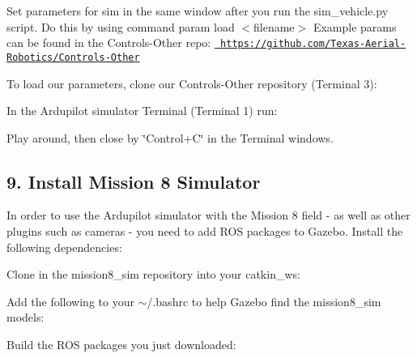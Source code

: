 Set parameters for sim in the same window after you run the {\ttfamily sim\+\_\+vehicle.\+py script}. Do this by using command {\ttfamily param load $<$filename$>$} Example params can be found in the {\ttfamily Controls-\/\+Other} repo\+: \href{https://github.com/Texas-Aerial-Robotics/Controls-Other}{\texttt{ https\+://github.\+com/\+Texas-\/\+Aerial-\/\+Robotics/\+Controls-\/\+Other}}

To load our parameters, clone our {\ttfamily Controls-\/\+Other} repository (Terminal 3)\+: 
\begin{DoxyCode}{0}
\end{DoxyCode}
 In the Ardupilot simulator Terminal (Terminal 1) run\+: 
\begin{DoxyCode}{0}
\end{DoxyCode}
 Play around, then close by \char`\"{}\+Control+\+C\char`\"{} in the Terminal windows.

\subsection*{9. Install Mission 8 Simulator}

In order to use the Ardupilot simulator with the Mission 8 field -\/ as well as other plugins such as cameras -\/ you need to add R\+OS packages to Gazebo. Install the following dependencies\+: 
\begin{DoxyCode}{0}
\end{DoxyCode}


Clone in the mission8\+\_\+sim repository into your catkin\+\_\+ws\+: 
\begin{DoxyCode}{0}
\end{DoxyCode}


Add the following to your {\ttfamily $\sim$/.bashrc} to help Gazebo find the mission8\+\_\+sim models\+: 
\begin{DoxyCode}{0}
\end{DoxyCode}


Build the R\+OS packages you just downloaded\+: 
\begin{DoxyCode}{0}
\end{DoxyCode}



